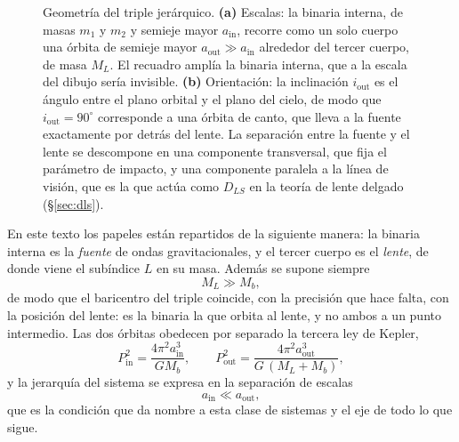 \documentclass[11pt,a4paper,openany]{book}
\newcommand{\ain}{a_{\mathrm{in}}}
\newcommand{\aout}{a_{\mathrm{out}}}
\begin{document}
\begin{figure}[htbp]
\begin{tikzpicture}[scale=0.95,>=Latex,font=\footnotesize]
\end{tikzpicture}
\caption{Geometr\'ia del triple jer\'arquico. \textbf{(a)} Escalas: la binaria
interna, de masas $m_1$ y $m_2$ y semieje mayor $\ain$, recorre como un solo
cuerpo una \'orbita de semieje mayor $\aout\gg\ain$ alrededor del tercer
cuerpo, de masa $M_L$. El recuadro ampl\'ia la binaria interna, que a la
escala del dibujo ser\'ia invisible. \textbf{(b)} Orientaci\'on: la
inclinaci\'on $i_\mathrm{out}$ es el \'angulo entre el plano orbital y el
plano del cielo, de modo que $i_\mathrm{out}=90^{\circ}$ corresponde a una
\'orbita de canto, que lleva a la fuente exactamente por detr\'as del lente.
La separaci\'on entre la fuente y el lente se descompone en una componente
transversal, que fija el par\'ametro de impacto, y una componente paralela a
la l\'inea de visi\'on, que es la que act\'ua como $D_{LS}$ en la teor\'ia de
lente delgado (\S\ref{sec:dls}).}
\label{fig:triple}
\end{figure}

En este texto los papeles est\'an repartidos de la siguiente manera: la
binaria interna es la \emph{fuente} de ondas gravitacionales, y el tercer
cuerpo es el \emph{lente}, de donde viene el sub\'indice $L$ en su masa.
Adem\'as se supone siempre
\begin{equation}
  M_L \gg M_b ,
  \label{eq:masiveL}
\end{equation}
de modo que el baricentro del triple coincide, con la precisi\'on que hace
falta, con la posici\'on del lente: es la binaria la que orbita al lente, y no
ambos a un punto intermedio. Las dos \'orbitas obedecen por separado la
tercera ley de Kepler,
\begin{equation}
  P_\mathrm{in}^{2}=\frac{4\pi^{2}\ain^{3}}{G M_b},
  \qquad
  P_\mathrm{out}^{2}=\frac{4\pi^{2}\aout^{3}}{G\,(M_L+M_b)},
  \label{eq:kepler}
\end{equation}
y la jerarqu\'ia del sistema se expresa en la separaci\'on de escalas
\begin{equation}
  \ain \ll \aout ,
  \label{eq:hierarchy}
\end{equation}
que es la condici\'on que da nombre a esta clase de sistemas y el eje de todo
lo que sigue.
\end{document}
